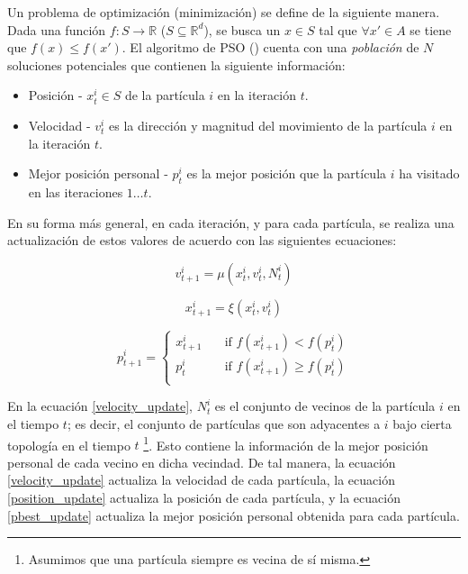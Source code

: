 \documentclass{article}
\begin{document}
Un problema de optimización (minimización) se define de la siguiente manera. Dada una función $f: S \rightarrow \mathbb{R}$ ($S \subseteq \mathbb{R}^d$), se busca un $x \in S$ tal que $\forall x' \in A$ se tiene que $f(x) \leq f(x')$. El algoritmo de PSO (\cite{kennedy95}) cuenta con una \textit{población} de $N$ soluciones potenciales que contienen la siguiente información: 

\begin{itemize}
    \item Posición - $x_t^i \in S$ de la partícula $i$ en la iteración $t$. 
    \item Velocidad - $v_t^i$ es la dirección y magnitud del movimiento de la partícula $i$ en la iteración $t$.
    \item Mejor posición personal - $p_t^i$ es la mejor posición que la partícula $i$ ha visitado en las iteraciones $1 \dots t$.
\end{itemize}{}

En su forma más general, en cada iteración, y para cada partícula, se realiza una actualización de estos valores de acuerdo con las siguientes ecuaciones: 

\begin{equation}
    \label{velocity_update}
    v_{t + 1}^i = \mu(x_t^i, v_t^i, N_t^i)
\end{equation}{}

\begin{equation}
    \label{position_update}
    x_{t + 1}^i = \xi(x_t^i, v_t^i)
\end{equation}{}

\begin{equation}
    \label{pbest_update}
    p_{t+1}^i = 
     \begin{cases}
      x_{t + 1}^i & \quad\text{if } f(x_{t + 1}^i) < f(p_{t}^i)\\
       p_{t}^i & \quad\text{if } f(x_{t + 1}^i) \geq f(p_{t}^i)\\
     \end{cases}
\end{equation}{}

En la ecuación \ref{velocity_update}, $N_t^i$ es el conjunto de vecinos de la partícula $i$ en el tiempo $t$; es decir, el conjunto de partículas que son adyacentes a $i$ bajo cierta topología en el tiempo $t$ \footnote{Asumimos que una partícula siempre es vecina de sí misma.}. Esto contiene la información de la mejor posición personal de cada vecino en dicha vecindad. De tal manera, la ecuación \ref{velocity_update} actualiza la velocidad de cada partícula, la ecuación \ref{position_update} actualiza la posición de cada partícula, y la ecuación \ref{pbest_update} actualiza la mejor posición personal obtenida para cada partícula.
\end{document}
